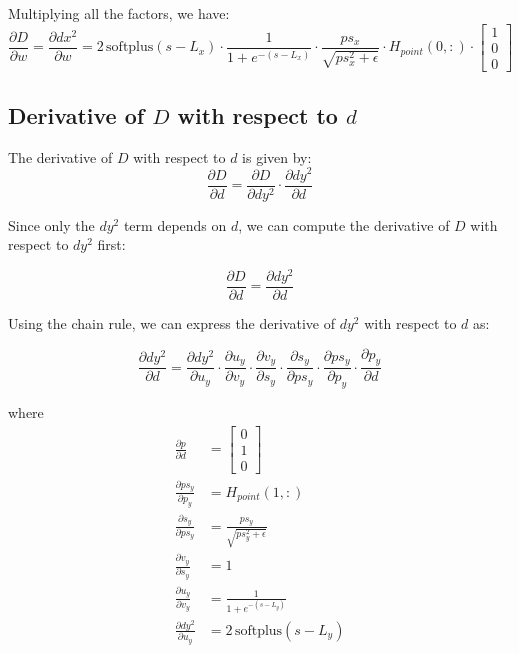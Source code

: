 \documentclass[11pt]{article}
\begin{document}
            Multiplying all the factors, we have:
            \begin{equation}
                \frac{\partial D}{\partial w} = \frac{\partial dx^2}{\partial w} = 2\,\text{softplus}(s - L_x) \cdot \frac{1}{1 + e^{-(s - L_x)}} \cdot \frac{ps_{x}}{\sqrt{ps_{x}^2 + \epsilon}} \cdot H_{point}(0,:) \cdot \begin{bmatrix} 1 \\ 0 \\ 0 \end{bmatrix}
            \end{equation}


    \subsection*{Derivative of $D$ with respect to $d$}
        The derivative of \(D\) with respect to \(d\) is given by:
        \begin{equation}
            \frac{\partial D}{\partial d} = \frac{\partial D}{\partial dy^2} \cdot \frac{\partial dy^2}{\partial d}
        \end{equation}

        Since only the \(dy^2\) term depends on \(d\), we can compute the derivative of \(D\) with respect to \(dy^2\) first:

        \begin{equation}
            \frac{\partial D}{\partial d} = \frac{\partial dy^2}{\partial d}
        \end{equation}

        Using the chain rule, we can express the derivative of \(dy^2\) with respect to \(d\) as:

        \begin{equation}
            \frac{\partial dy^2}{\partial d} = \frac{\partial dy^2}{\partial u_y} \cdot \frac{\partial u_y}{\partial v_y} \cdot \frac{\partial v_y}{\partial s_y} \cdot \frac{\partial s_y}{\partial ps_{y}} \cdot \frac{\partial ps_{y}}{\partial p_y} \cdot \frac{\partial p_y}{\partial d}
        \end{equation}

        where
        \begin{align}
            \frac{\partial p}{\partial d} &= \begin{bmatrix} 0 \\ 1 \\ 0 \end{bmatrix} \\
            \frac{\partial ps_{y}}{\partial p_y} &= H_{point}(1,:)\\
            \frac{\partial s_{y}}{\partial ps_{y}} &= \frac{ps_{y}}{\sqrt{ps_{y}^2 + \epsilon}}\\
            \frac{\partial v_{y}}{\partial s_{y}} &= 1\\
            \frac{\partial u_{y}}{\partial v_{y}} &= \frac{1}{1 + e^{-(s - L_y)}}\\
            \frac{\partial dy^2}{\partial u_y} &= 2\,\text{softplus}(s - L_y)\\
        \end{align}
\end{document}
